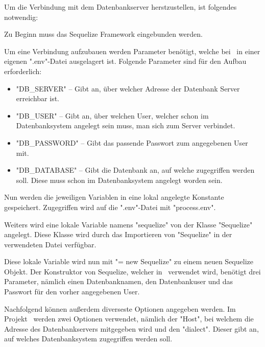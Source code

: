 
Um die Verbindung mit dem Datenbankserver herstzustellen, ist folgendes notwendig:

Zu Beginn muss das Sequelize Framework eingebunden werden.


Um eine Verbindung aufzubauen werden Parameter benötigt, welche bei \ZELIA\ in einer eigenen ".env"-Datei ausgelagert ist. Folgende Parameter sind für den Aufbau erforderlich:

\begin{itemize}
    \item "DB\_SERVER" -- Gibt an, über welcher Adresse der Datenbank Server erreichbar ist.
    \item "DB\_USER" -- Gibt an, über welchen User, welcher schon im Datenbanksystem angelegt sein muss, man sich zum Server verbindet.
    \item "DB\_PASSWORD" -- Gibt das passende Passwort zum angegebenen User mit.
    \item "DB\_DATABASE" -- Gibt die Datenbank an, auf welche zugegriffen werden soll. Diese muss schon im Datenbanksystem angelegt worden sein.
\end{itemize}

Nun werden die jeweiligen Variablen in eine lokal angelegte Konstante gespeichert. Zugegriffen wird auf die ".env"-Datei mit "{\ttfamily process.env}".


Weiters wird eine lokale Variable namens "sequelize" von der Klasse "Sequelize" angelegt. Diese Klasse wird durch das Importieren von "Sequelize" in der verwendeten Datei verfügbar.


Diese lokale Variable wird nun mit "{\ttfamily = new Sequelize}" zu einem neuen Sequelize Objekt. Der Konstruktor von Sequelize, welcher in \ZELIA\ verwendet wird, benötigt drei Parameter, nämlich einen Datenbanknamen, den Datenbankuser und das Passwort für den vorher angegebenen User. 

Nachfolgend können außerdem diverseste Optionen angegeben werden. Im Projekt \ZELIA\ werden zwei Optionen verwendet, nämlich der "Host", bei welchem die Adresse des Datenbankservers mitgegeben wird und den "dialect". Dieser gibt an, auf welches Datenbanksystem zugegriffen werden soll.

